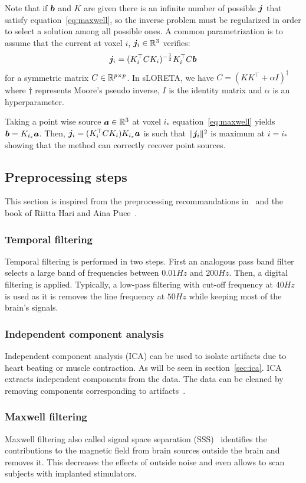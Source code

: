 Note that if $\boldsymbol{b}$ and $K$ are given there is an infinite number of possible
$\boldsymbol{j}$ that satisfy equation~\eqref{eq:maxwell}, so the inverse problem must be regularized in order to select a solution among all possible ones.
A common parametrization is to assume that the current at voxel $i$, $\boldsymbol{j}_i \in
\mathbb{R}^3$ verifies:
\begin{align}
\boldsymbol{j}_i = (K_i^{\top} C K_i)^{-\frac12} K_i^{\top} C \boldsymbol{b}
\end{align}
for a symmetric matrix $C \in \mathbb{R}^{p \times p}$.
In sLORETA, we have $C = (K K^{\top} + \alpha I)^{\dagger}$ where $\dagger$
represents Moore's pseudo inverse, $I$ is the identity matrix and $\alpha$ is an hyperparameter. 

Taking a point wise source $\boldsymbol{a} \in \mathbb{R}^{3}$ at voxel $i_*$
equation~\eqref{eq:maxwell} yields $\boldsymbol{b} = K_{i_*} \boldsymbol{a}$.
Then, $\boldsymbol{j}_i = (K_i^{\top} C K_i) K_{i_*} \boldsymbol{a}$ is such that $\| \boldsymbol{j}_i \|^2$ is maximum at $i=i_*$ showing that the method can correctly recover point sources.

\subsection{Preprocessing steps}
This section is inspired from the preprocessing recommandations
in~\cite{jas2018reproducible} and the book of Riitta Hari and Aina
Puce~\cite{hari2017meg}. 

\subsubsection{Temporal filtering}
Temporal filtering is performed in two steps. First an analogous pass band
filter selects a large band of frequencies between $0.01 Hz$ and $200Hz$.
Then, a digital filtering is applied. Typically, a low-pass filtering with
cut-off frequency at $40 Hz$ is used as it is removes the line frequency at
$50 Hz$ while keeping most of the brain's signals.

\subsubsection{Independent component analysis}
Independent component analysis (ICA) can be used to isolate artifacts due to
heart beating or muscle contraction. As will be seen in section~\ref{sec:ica}.
ICA extracts independent components from the data. The data can be cleaned by
removing components corresponding to artifacts~\cite{jung1998extended}.

\subsubsection{Maxwell filtering}
Maxwell filtering also called signal space separation
(SSS)~\cite{taulu2006spatiotemporal} identifies the contributions to the
magnetic field from brain sources outside the brain and removes it.
This decreases the effects of outside noise and even allows to scan subjects with
implanted stimulators.


